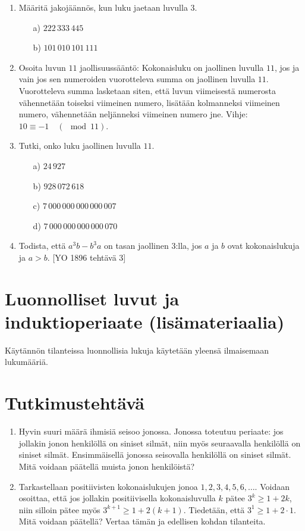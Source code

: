 \begin{enumerate}
\item
Määritä jakojäännös, kun luku jaetaan luvulla $3$.
\begin{itemize}
\item[a)] $222\, 333\, 445$
\item[b)] $101\, 010\, 101\, 111$
\end{itemize}

\item
Osoita luvun $11$ jaollisuussääntö: Kokonaisluku on jaollinen luvulla $11$, jos ja vain jos sen numeroiden vuorotteleva summa on jaollinen luvulla $11$. Vuorotteleva summa lasketaan siten, että luvun viimeisestä numerosta vähennetään toiseksi viimeinen numero, lisätään kolmanneksi viimeinen numero, vähennetään neljänneksi viimeinen numero jne. Vihje: $10\equiv -1\quad(\mod 11)$.

\item Tutki, onko luku jaollinen luvulla $11$.
\begin{itemize}
\item[a)] $24\, 927$
\item[b)] $928\, 072\, 618$
\item[c)] $7\, 000\, 000\, 000\, 000\, 007$
\item[d)] $7\, 000\, 000\, 000\, 000\, 070$
\end{itemize}

\item Todista, että $a^3b-b^3a$ on tasan jaollinen $3$:lla, jos $a$ ja $b$ ovat kokonaislukuja ja $a>b$. 
[YO 1896 tehtävä 3]

\end{enumerate}

\newpage

\section{Luonnolliset luvut ja induktioperiaate (lisämateriaalia)}
Käytännön tilanteissa luonnollisia lukuja käytetään yleensä ilmaisemaan lukumääriä. 

\section*{Tutkimustehtävä}
\begin{enumerate}
\item
Hyvin suuri määrä ihmisiä seisoo jonossa. Jonossa toteutuu periaate: jos jollakin jonon
henkilöllä on siniset silmät, niin myös seuraavalla henkilöllä on siniset silmät. Ensimmäisellä jonossa seisovalla henkilöllä on siniset silmät. Mitä voidaan päätellä muista jonon henkilöistä?
\item
Tarkastellaan positiivisten kokonaislukujen jonoa $1, 2, 3, 4, 5, 6,\ldots$. Voidaan osoittaa, että jos jollakin positiivisella kokonaisluvulla $k$ pätee $3^k \ge 1+2k$, niin silloin pätee myös $3^{k+1} \ge 1+2(k+1)$. Tiedetään, että $3^1 \ge 1 + 2 \cdot 1$. Mitä voidaan päätellä? Vertaa tämän ja edellisen kohdan tilanteita.
\end{enumerate}

